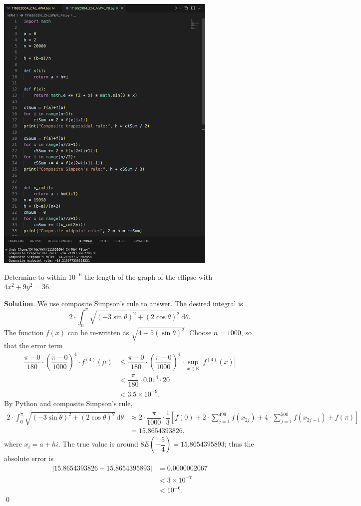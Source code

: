 \documentclass[11pt]{article}
\theoremstyle{break}
\newcommand{\ddi}{\text{$\,$d}}
\numberwithin{equation}{theorem}
\begin{document}
\begin{center}
    \includegraphics[width=0.8\textwidth]{P8.png}
\end{center}


\newpage
\begin{problem}\label{problem 9} %
    Determine to within $10^{-6}$ the length of the graph of the ellipse with $4x^2+9y^2=36$.
\end{problem}
\textbf{Solution}. We use composite Simpson's rule to answer. The desired integral is $$2\cdot\int_{0}^{\pi}\sqrt{\left(-3\sin\theta\right)^2+\left(2\cos\theta\right)^2}\ddi\theta.$$ The function $f(x)$ can be re-written as $\displaystyle\sqrt{4+5(\sin\theta)^2}$. Choose $n=1000$, so that the error term \begin{align*}
    \dfrac{\pi-0}{180}\cdot\left(\dfrac{\pi-0}{1000}\right)^4\cdot f^{(4)}(\mu)&\leq\dfrac{\pi-0}{180}\cdot\left(\dfrac{\pi-0}{1000}\right)^4\cdot \sup_{x\in\mathbb{R}}\left|f^{(4)}(x)\right|\\
    &<\dfrac{\pi}{180}\cdot0.01^4\cdot20\\
    &<3.5\times10^{-9}.
\end{align*} By Python and composite Simpson's rule, \begin{align*}
    2\cdot\int_{0}^{\pi}\sqrt{\left(-3\sin\theta\right)^2+\left(2\cos\theta\right)^2}\ddi\theta&\approx2\cdot\dfrac{\pi}{1000}\cdot\dfrac{1}{3}\left[f(0)+2\cdot\sum_{j=1}^{499}f(x_{2j})+4\cdot\sum_{j=1}^{500}f(x_{2j-1})+f(\pi)\right]\\
    &=15.8654393826,
\end{align*} where $x_i=a+hi$. The true value is around $8E\left(-\dfrac{5}{4}\right)=15.8654395893$; thus the absolute error is \begin{align*}
    \left|15.8654393826-15.8654395893\right|&=0.0000002067\\
    &<3\times10^{-7}\\
    &<10^{-6}.
\end{align*} \qed
\end{document}
